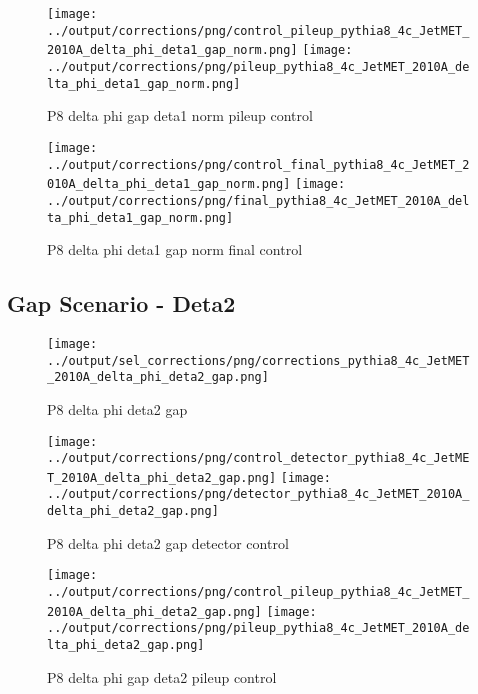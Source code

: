 \documentclass[11pt]{book}
\begin{document}
\begin{figure}[ht]
\centering
\texttt{[image: ../output/corrections/png/control\_pileup\_pythia8\_4c\_JetMET\_2010A\_delta\_phi\_deta1\_gap\_norm.png]}
\texttt{[image: ../output/corrections/png/pileup\_pythia8\_4c\_JetMET\_2010A\_delta\_phi\_deta1\_gap\_norm.png]}
\caption{P8 delta phi gap deta1 norm pileup control}
\label{fig:p8_JetMET_2010A_delta_phi_deta1_gap_norm_pileup_control}
\end{figure}


\begin{figure}[ht]
\centering
\texttt{[image: ../output/corrections/png/control\_final\_pythia8\_4c\_JetMET\_2010A\_delta\_phi\_deta1\_gap\_norm.png]}
\texttt{[image: ../output/corrections/png/final\_pythia8\_4c\_JetMET\_2010A\_delta\_phi\_deta1\_gap\_norm.png]}
\caption{P8 delta phi deta1 gap norm final control}
\label{fig:p8_JetMET_2010A_delta_phi_deta1_gap_norm_final_control}
\end{figure}


\clearpage
\subsection{Gap Scenario - Deta2}
\begin{figure}[ht]
\centering
\texttt{[image: ../output/sel\_corrections/png/corrections\_pythia8\_4c\_JetMET\_2010A\_delta\_phi\_deta2\_gap.png]}
\caption{P8 delta phi deta2 gap}
\label{fig:p8_JetMET_2010A_delta_phi_deta2_gap}
\end{figure}

\begin{figure}[ht]
\centering
\texttt{[image: ../output/corrections/png/control\_detector\_pythia8\_4c\_JetMET\_2010A\_delta\_phi\_deta2\_gap.png]}
\texttt{[image: ../output/corrections/png/detector\_pythia8\_4c\_JetMET\_2010A\_delta\_phi\_deta2\_gap.png]}
\caption{P8 delta phi deta2 gap detector control}
\label{fig:p8_JetMET_2010A_delta_phi_deta2_gap_detector_control}
\end{figure}

\begin{figure}[ht]
\centering
\texttt{[image: ../output/corrections/png/control\_pileup\_pythia8\_4c\_JetMET\_2010A\_delta\_phi\_deta2\_gap.png]}
\texttt{[image: ../output/corrections/png/pileup\_pythia8\_4c\_JetMET\_2010A\_delta\_phi\_deta2\_gap.png]}
\caption{P8 delta phi gap deta2 pileup control}
\label{fig:p8_JetMET_2010A_delta_phi_deta2_gap_pileup_control}
\end{figure}
\end{document}
